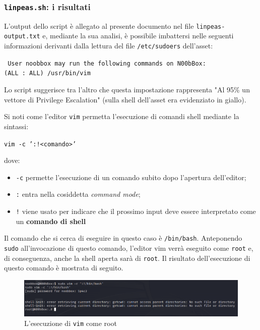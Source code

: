 \documentclass[a4paper, 12pt, oneside]{article}
\begin{document}
\newpage
\subsubsection{\texttt{linpeas.sh}: i risultati}
L'output dello script è allegato al presente documento nel file \texttt{linpeas-output.txt} e, mediante la sua analisi, è possibile imbattersi nelle seguenti informazioni derivanti dalla lettura del file \texttt{/etc/sudoers} dell'asset:

\begin{center}
    \texttt{
    User noobbox may run the following commands on N00bBox:\\
        (ALL : ALL) /usr/bin/vim}
\end{center}

Lo script suggerisce tra l'altro che questa impostazione rappresenta "Al 95\% un vettore di Privilege Escalation" (sulla shell dell'asset era evidenziato in giallo).

Si noti come l'editor \texttt{vim} permetta l'esecuzione di comandi shell mediante la sintassi:

\begin{center}
    \texttt{vim -c ':!<comando>'}
\end{center}

dove:

\begin{itemize}
    \item \texttt{-c} permette l'esecuzione di un comando subito dopo l'apertura dell'editor;
    \item \texttt{:} entra nella cosiddetta \textit{command mode};
    \item \texttt{!} viene usato per indicare che il prossimo input deve essere interpretato come un \textbf{comando di shell}
\end{itemize}

Il comando che si cerca di eseguire in questo caso è \texttt{/bin/bash}. Anteponendo \texttt{sudo} all'invocazione di questo comando, l'editor vim verrà eseguito come \texttt{root} e, di conseguenza, anche la shell aperta sarà di \texttt{root}. Il risultato dell'esecuzione di questo comando è mostrata di seguito.

\begin{figure}[h!]
    \centering
    \includegraphics[width=\textwidth]{img/vim.png}
    \caption{L'esecuzione di \texttt{vim} come root}
\end{figure}
\end{document}
